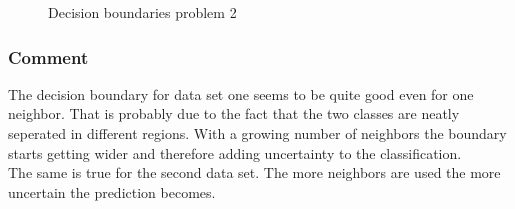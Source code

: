 \documentclass{article}
\begin{document}
\begin{figure}[H]
		
		
		\caption{\label{boundary2.3p2}Decision boundaries problem 2}
		
	\end{figure}

\subsubsection{Comment}
The decision boundary for data set one seems to be quite good even for one neighbor. That is probably due to the fact that the two classes are neatly seperated in different regions. With a growing number of neighbors the boundary starts getting wider and therefore adding uncertainty to the classification. \\
The same is true for the second data set. The more neighbors are used the more uncertain the prediction becomes.
\end{document}
